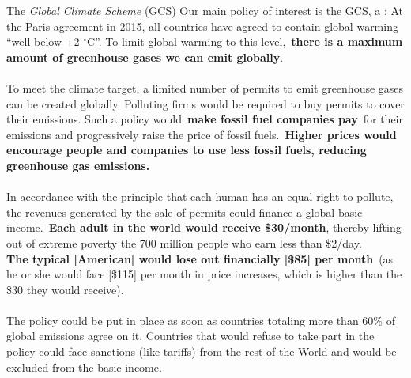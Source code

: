 \documentclass[aspectratio=169,xcolor=dvipsnames, 11pt,mathserif]{beamer}
\begin{document}
\begin{frame}{The \textit{Global Climate Scheme} (GCS)\label{GCS_def} \hyperlink{support}{}}
    \bbvs \ip Our main policy of interest is the GCS, a :
    \bbvs \ip \small{ At the Paris agreement in 2015, all countries have agreed to contain global warming ``well below +2 $\mathrm{{}^\circ}$C''. To limit global warming to this level,~\textbf{there is a maximum amount of greenhouse gases we can emit globally}.\\ \quad \\
    To meet the climate target, a limited number of permits to emit greenhouse gases can be created globally. Polluting firms would be required to buy permits to cover their emissions. Such a policy would~\textbf{make fossil fuel companies pay}~for their emissions and progressively raise the price of fossil fuels.~\textbf{Higher prices would encourage people and companies to use less fossil fuels, reducing greenhouse gas emissions.}\\ \quad \\
    In accordance with the principle that each human has an equal right to pollute, the revenues generated by the sale of permits could finance a global basic income.~\textbf{Each adult in the world would receive \$30/month}, thereby lifting out of extreme poverty the 700 million people who earn less than \$2/day.\\ 
    \textbf{The typical [American] would lose out financially [\$85] per month}~(as he or she would face [\$115] per month in price increases, which is higher than the \$30 they would receive). \\ \quad \\
    The policy could be put in place as soon as countries totaling more than 60\% of global emissions agree on it. Countries that would refuse to take part in the policy could face sanctions (like tariffs) from the rest of the World and would be excluded from the basic income.}
    \ee
    \ee
\end{frame}
\end{document}
